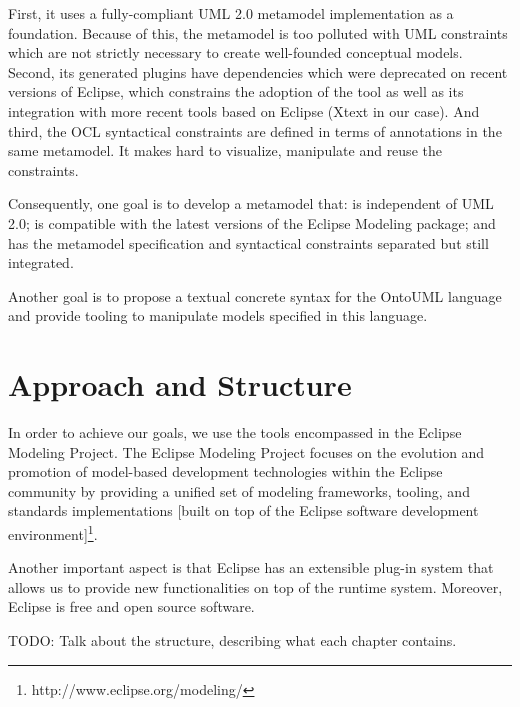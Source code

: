 \documentclass[
	10pt,				%
	oneside,
	a4paper,			%
	brazil,
	english
	]{abntex2}
\begin{document}
First, it uses a fully-compliant UML 2.0 metamodel implementation as a foundation.
Because of this, the metamodel is too polluted with UML constraints which are not
strictly necessary to create well-founded conceptual models.
%
Second, its generated plugins have dependencies which were deprecated on recent
versions of Eclipse, which constrains the adoption of the tool as well as its
integration with more recent tools based on Eclipse (Xtext in our case).
%
%
And third, the OCL syntactical constraints are defined in terms of annotations in
the same metamodel. It makes hard to visualize, manipulate and reuse the constraints.

Consequently, one goal is to develop a metamodel that: is independent of UML 2.0;
is compatible with the latest versions of the Eclipse Modeling package;
and has the metamodel specification and syntactical constraints separated but
still integrated.

Another goal is to propose a textual concrete syntax for the OntoUML language and
provide tooling to manipulate models specified in this language.
%

\section{Approach and Structure}

In order to achieve our goals, we use the tools encompassed in the Eclipse Modeling
Project. The Eclipse Modeling Project focuses on the evolution and promotion of
model-based development technologies
within the Eclipse community by providing a unified set of modeling frameworks,
tooling, and standards implementations [built on top of the Eclipse software
development environment]\footnote{http://www.eclipse.org/modeling/}.

Another important aspect is that Eclipse has an extensible plug-in system that
allows us to provide new functionalities on top of the runtime system.
Moreover, Eclipse is free and open source software.

TODO: Talk about the structure, describing what each chapter contains.
\end{document}
